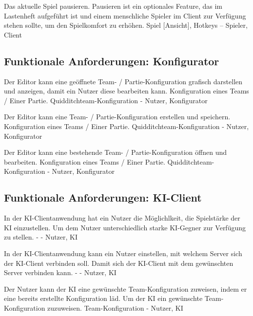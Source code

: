         {Das aktuelle Spiel pausieren.}
        {Pausieren ist ein optionales Feature, das im Lastenheft aufgeführt ist und einem menschliche Spieler im Client zur Verfügung stehen sollte, um den Spielkomfort zu erhöhen.}
        {Spiel [Ansicht], Hotkeys}
        {--}
        {Spieler, Client}
        

\subsection{Funktionale Anforderungen: Konfigurator}
    
        {Der Editor kann eine geöffnete Team- / Partie-Konfiguration grafisch darstellen und anzeigen, damit ein Nutzer diese bearbeiten kann.}
        {Konfiguration eines Teams / Einer Partie.}
        {Quidditchteam-Konfiguration}
        {-}
        {Nutzer, Konfigurator}	

        {Der Editor kann eine Team- / Partie-Konfiguration erstellen und speichern.}
        {Konfiguration eines Teams / Einer Partie.}
        {Quidditchteam-Konfiguration}
        {-}
        {Nutzer, Konfigurator}	

        {Der Editor kann eine bestehende Team- / Partie-Konfiguration öffnen und bearbeiten.}
        {Konfiguration eines Teams / Einer Partie.}
        {Quidditchteam-Konfiguration}
        {-}
        {Nutzer, Konfigurator}
        
\subsection{Funktionale Anforderungen: KI-Client}

        {In der KI-Clientanwendung hat ein Nutzer die Möglichlkeit, die Spielstärke der KI einzustellen.}
        {Um dem Nutzer unterschiedlich starke KI-Gegner zur Verfügung zu stellen.}
        {-}
        {-}
        {Nutzer, KI}
        
        {In der KI-Clientanwendung kann ein Nutzer einstellen, mit welchem Server sich der KI-Client verbinden soll.}
        {Damit sich der KI-Client mit dem gewünschten Server verbinden kann.}
        {-}
        {-}
        {Nutzer, KI}

        {Der Nutzer kann der KI eine gewünschte Team-Konfiguration zuweisen, indem er eine bereits erstellte Konfiguration läd.}
        {Um der KI ein gewünschte Team-Konfiguration zuzuweisen.}
        {Team-Konfiguration}
        {-}
        {Nutzer, KI}

